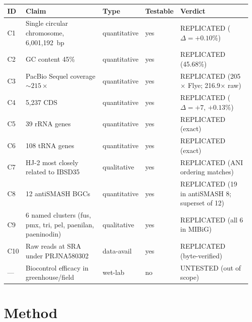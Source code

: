 \documentclass[11pt,a4paper]{article}
\begin{document}
\begin{longtable}{@{}l p{7.5cm} l l l@{}}
\toprule
ID & Claim & Type & Testable & Verdict \\
\midrule\endhead
C1  & Single circular chromosome, 6{,}001{,}192~bp                                 & quantitative & yes & REPLICATED ($\Delta{=}{+}0.10\%$) \\
C2  & GC content 45\%                                                              & quantitative & yes & REPLICATED (45.68\%) \\
C3  & PacBio Sequel coverage ${\sim}215{\times}$                                   & quantitative & yes & REPLICATED (205${\times}$ Flye; 216.9${\times}$ raw) \\
C4  & 5{,}237 CDS                                                                  & quantitative & yes & REPLICATED ($\Delta{=}{+}7$, ${+}0.13\%$) \\
C5  & 39 rRNA genes                                                                & quantitative & yes & REPLICATED (exact) \\
C6  & 108 tRNA genes                                                               & quantitative & yes & REPLICATED (exact) \\
C7  & HJ-2 most closely related to IBSD35                                          & qualitative  & yes & REPLICATED (ANI ordering matches) \\
C8  & 12 antiSMASH BGCs                                                            & quantitative & yes & REPLICATED (19 in antiSMASH 8; superset of 12) \\
C9  & 6 named clusters (fus, pmx, tri, pel, paenilan, paeninodin)                  & qualitative  & yes & REPLICATED (all 6 in MIBiG) \\
C10 & Raw reads at SRA under PRJNA580302                                            & data-avail   & yes & REPLICATED (byte-verified) \\
--- & Biocontrol efficacy in greenhouse/field                                       & wet-lab      & no  & UNTESTED (out of scope) \\
\bottomrule
\end{longtable}

\section{Method}
\end{document}
